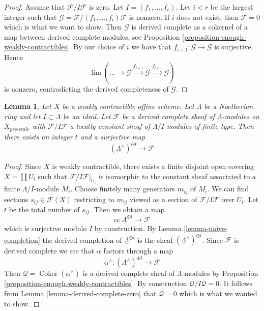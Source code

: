 \documentclass{stacks-project}
\theoremstyle{plain}
\newtheorem{lemma}[subsection]{Lemma}
\theoremstyle{definition}
\theoremstyle{remark}
\numberwithin{equation}{subsection}
\def\lim{\mathop{\mathrm{lim}}\nolimits}
\def\proetale{{pro\text{-}\acute{e}tale}}
\def\Coker{\mathop{\mathrm{Coker}}}
\begin{document}
\begin{proof}
Assume that $\mathcal{F}/I\mathcal{F}$ is zero.
Let $I = (f_1, \ldots, f_r)$. Let $i < r$ be the largest
integer such that $\mathcal{G} = \mathcal{F}/(f_1, \ldots, f_i)\mathcal{F}$
is nonzero. If $i$ does not exist, then $\mathcal{F} = 0$ which is what we
want to show. Then $\mathcal{G}$ is derived complete as a cokernel
of a map between derived complete modules, see
Proposition \ref{proposition-enough-weakly-contractibles}.
By our choice of $i$ we have that $f_{i + 1} : \mathcal{G} \to \mathcal{G}$
is surjective. Hence
$$
\lim (\ldots \to \mathcal{G} \xrightarrow{f_{i + 1}} \mathcal{G}
\xrightarrow{f_{i + 1}} \mathcal{G})
$$
is nonzero, contradicting the derived completeness of $\mathcal{G}$.
\end{proof}

\begin{lemma}
\label{lemma-derived-complete-limit}
Let $X$ be a weakly contractible affine scheme.
Let $\Lambda$ be a Noetherian ring and let $I \subset \Lambda$ be an ideal.
Let $\mathcal{F}$ be a derived complete sheaf of $\Lambda$-modules
on $X_\proetale$ with $\mathcal{F}/I\mathcal{F}$ a locally
constant sheaf of $\Lambda/I$-modules of finite type.
Then there exists an integer $t$ and a surjective map
$$
(\underline{\Lambda}^\wedge)^{\oplus t} \to \mathcal{F}
$$
\end{lemma}

\begin{proof}
Since $X$ is weakly contractible, there exists a finite disjoint open
covering $X = \coprod U_i$ such that $\mathcal{F}/I\mathcal{F}|_{U_i}$
is isomorphic to the constant sheaf associated to a finite $\Lambda/I$-module
$M_i$. Choose finitely many generators $m_{ij}$ of $M_i$. We
can find sections $s_{ij} \in \mathcal{F}(X)$ restricting to
$m_{ij}$ viewed as a section of $\mathcal{F}/I\mathcal{F}$ over $U_i$. 
Let $t$ be the total number of $s_{ij}$. Then we obtain a map
$$
\alpha : \underline{\Lambda}^{\oplus t} \longrightarrow \mathcal{F}
$$
which is surjective modulo $I$ by construction. By
Lemma \ref{lemma-naive-completion}
the derived completion of $\underline{\Lambda}^{\oplus t}$ is the
sheaf $(\underline{\Lambda}^\wedge)^{\oplus t}$. Since $\mathcal{F}$
is derived complete we see that $\alpha$ factors through a map
$$
\alpha^\wedge :
(\underline{\Lambda}^\wedge)^{\oplus t}
\longrightarrow
\mathcal{F}
$$
Then $\mathcal{Q} = \Coker(\alpha^\wedge)$ is a derived complete
sheaf of $\Lambda$-modules by
Proposition \ref{proposition-enough-weakly-contractibles}.
By construction $\mathcal{Q}/I\mathcal{Q} = 0$. It follows from
Lemma \ref{lemma-derived-complete-zero}
that $\mathcal{Q} = 0$ which is what we wanted to show.
\end{proof}
\end{document}
